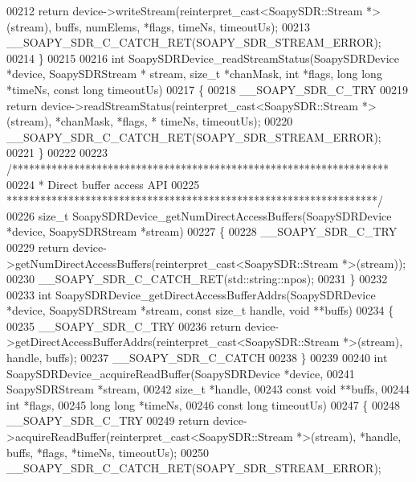 \begin{DoxyCode}
00212     \textcolor{keywordflow}{return} device->writeStream(reinterpret\_cast<SoapySDR::Stream *>(stream), buffs, numElems, *flags, 
      timeNs, timeoutUs);
00213     __SOAPY_SDR_C_CATCH_RET(SOAPY_SDR_STREAM_ERROR);
00214 \}
00215 
00216 \textcolor{keywordtype}{int} SoapySDRDevice_readStreamStatus(SoapySDRDevice *device, SoapySDRStream *
      stream, \textcolor{keywordtype}{size\_t} *chanMask, \textcolor{keywordtype}{int} *flags, \textcolor{keywordtype}{long} \textcolor{keywordtype}{long} *timeNs, \textcolor{keyword}{const} \textcolor{keywordtype}{long} timeoutUs)
00217 \{
00218     __SOAPY_SDR_C_TRY
00219     \textcolor{keywordflow}{return} device->readStreamStatus(reinterpret\_cast<SoapySDR::Stream *>(stream), *chanMask, *flags, *
      timeNs, timeoutUs);
00220     __SOAPY_SDR_C_CATCH_RET(SOAPY_SDR_STREAM_ERROR);
00221 \}
00222 
00223 \textcolor{comment}{/*******************************************************************}
00224 \textcolor{comment}{ * Direct buffer access API}
00225 \textcolor{comment}{ ******************************************************************/}
00226 \textcolor{keywordtype}{size\_t} SoapySDRDevice_getNumDirectAccessBuffers(SoapySDRDevice *device, 
      SoapySDRStream *stream)
00227 \{
00228     __SOAPY_SDR_C_TRY
00229     \textcolor{keywordflow}{return} device->getNumDirectAccessBuffers(reinterpret\_cast<SoapySDR::Stream *>(stream));
00230     __SOAPY_SDR_C_CATCH_RET(std::string::npos);
00231 \}
00232 
00233 \textcolor{keywordtype}{int} SoapySDRDevice_getDirectAccessBufferAddrs(SoapySDRDevice *device, 
      SoapySDRStream *stream, \textcolor{keyword}{const} \textcolor{keywordtype}{size\_t} handle, \textcolor{keywordtype}{void} **buffs)
00234 \{
00235     __SOAPY_SDR_C_TRY
00236     \textcolor{keywordflow}{return} device->getDirectAccessBufferAddrs(reinterpret\_cast<SoapySDR::Stream *>(stream), handle, buffs);
00237     __SOAPY_SDR_C_CATCH
00238 \}
00239 
00240 \textcolor{keywordtype}{int} SoapySDRDevice_acquireReadBuffer(SoapySDRDevice *device,
00241     SoapySDRStream *stream,
00242     \textcolor{keywordtype}{size\_t} *handle,
00243     \textcolor{keyword}{const} \textcolor{keywordtype}{void} **buffs,
00244     \textcolor{keywordtype}{int} *flags,
00245     \textcolor{keywordtype}{long} \textcolor{keywordtype}{long} *timeNs,
00246     \textcolor{keyword}{const} \textcolor{keywordtype}{long} timeoutUs)
00247 \{
00248     __SOAPY_SDR_C_TRY
00249     \textcolor{keywordflow}{return} device->acquireReadBuffer(reinterpret\_cast<SoapySDR::Stream *>(stream), *handle, buffs, *flags, 
      *timeNs, timeoutUs);
00250     __SOAPY_SDR_C_CATCH_RET(SOAPY_SDR_STREAM_ERROR);

\end{DoxyCode}
